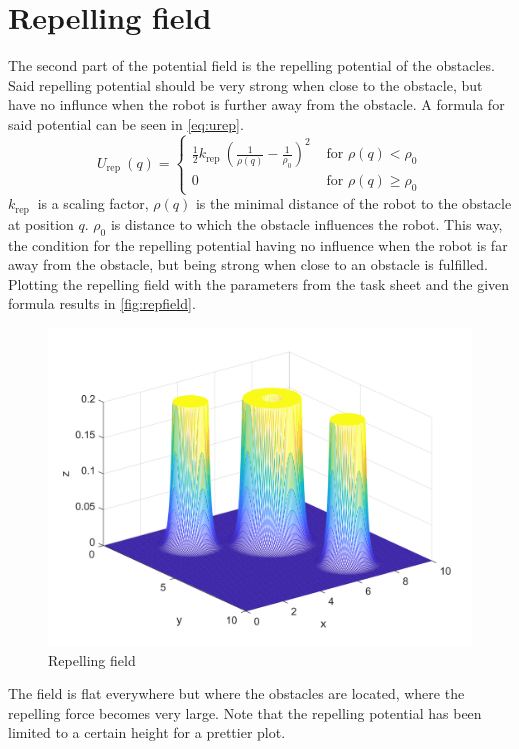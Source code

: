 \documentclass[11pt]{article}
\begin{document}
    \section{Repelling field}\label{sec:rep-field}
    The second part of the potential field is the repelling potential of the obstacles.
    Said repelling potential should be very strong when close to the obstacle, but have no influnce when the robot is further away from the obstacle.
    A formula for said potential can be seen in \autoref{eq:urep}.
    \begin{equation}\label{eq:urep}
        U_{\text {rep }}(q)=\left\{\begin{array}{ll}
                                       \frac{1}{2} k_{\text {rep }}\left(\frac{1}{\rho(q)}-\frac{1}{\rho_{0}}\right)^{2} & \text { for } \rho(q)<\rho_{0} \\
                                       0 & \text { for } \rho(q) \geq \rho_{0}
        \end{array}\right.
    \end{equation}
    $k_{\text {rep }}$ is a scaling factor, $\rho(q)$ is the minimal distance of the robot to the obstacle at position $q$.
    $\rho_{0}$ is distance to which the obstacle influences the robot.
    This way, the condition for the repelling potential having no influence when the robot is far away from the obstacle, but being strong when close to an obstacle is fulfilled.
    Plotting the repelling field with the parameters from the task sheet and the given formula results in \autoref{fig:repfield}.
    \begin{figure}[H]
        \centering
        \includegraphics[width=1.0\textwidth]{../test/images/u_rep}
        \caption{Repelling field}
        \label{fig:repfield}
    \end{figure}
    The field is flat everywhere but where the obstacles are located, where the repelling force becomes very large.
    Note that the repelling potential has been limited to a certain height for a prettier plot.
\end{document}
